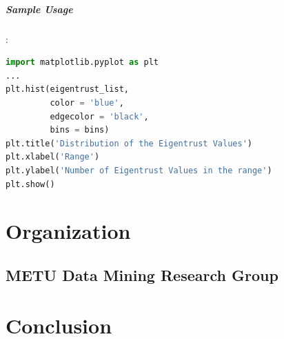 \documentclass[12pt]{article}
\begin{document}
\subparagraph{Sample Usage}:
\begin{lstlisting}[language=python, caption=Matplotlib example]
import matplotlib.pyplot as plt
...
plt.hist(eigentrust_list, 
		 color = 'blue', 
		 edgecolor = 'black',
		 bins = bins)
plt.title('Distribution of the Eigentrust Values')
plt.xlabel('Range')
plt.ylabel('Number of Eigentrust Values in the range')
plt.show() 
\end{lstlisting}

\section{Organization}
\subsection{METU Data Mining Research Group}

\section{Conclusion}



\end{document}
